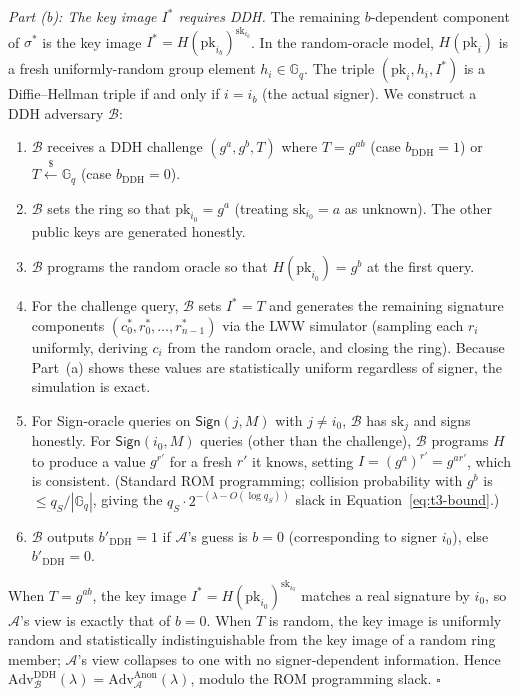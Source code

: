 \emph{Part (b): The key image $I^*$ requires DDH.} The remaining $b$-dependent component of $\sigma^*$ is the key image $I^* = H(\text{pk}_{i_b})^{\text{sk}_{i_b}}$. In the random-oracle model, $H(\text{pk}_i)$ is a fresh uniformly-random group element $h_i \in \mathbb{G}_q$. The triple $(\text{pk}_i, h_i, I^*)$ is a Diffie--Hellman triple if and only if $i = i_b$ (the actual signer). We construct a DDH adversary $\mathcal{B}$:
\begin{enumerate}
    \item $\mathcal{B}$ receives a DDH challenge $(g^a, g^b, T)$ where $T = g^{ab}$ (case $b_{\text{DDH}} = 1$) or $T \stackrel{\$}{\leftarrow} \mathbb{G}_q$ (case $b_{\text{DDH}} = 0$).
    \item $\mathcal{B}$ sets the ring so that $\text{pk}_{i_0} = g^a$ (treating $\text{sk}_{i_0} = a$ as unknown). The other public keys are generated honestly.
    \item $\mathcal{B}$ programs the random oracle so that $H(\text{pk}_{i_0}) = g^b$ at the first query.
    \item For the challenge query, $\mathcal{B}$ sets $I^* = T$ and generates the remaining signature components $(c_0^*, r_0^*, \ldots, r_{n-1}^*)$ via the LWW simulator (sampling each $r_i$ uniformly, deriving $c_i$ from the random oracle, and closing the ring). Because Part~(a) shows these values are statistically uniform regardless of signer, the simulation is exact.
    \item For Sign-oracle queries on $\mathsf{Sign}(j, M)$ with $j \neq i_0$, $\mathcal{B}$ has $\text{sk}_j$ and signs honestly. For $\mathsf{Sign}(i_0, M)$ queries (other than the challenge), $\mathcal{B}$ programs $H$ to produce a value $g^{r'}$ for a fresh $r'$ it knows, setting $I = (g^a)^{r'} = g^{a r'}$, which is consistent. (Standard ROM programming; collision probability with $g^b$ is $\leq q_S / |\mathbb{G}_q|$, giving the $q_S \cdot 2^{-(\lambda - O(\log q_S))}$ slack in Equation~\eqref{eq:t3-bound}.)
    \item $\mathcal{B}$ outputs $b'_{\text{DDH}} = 1$ if $\mathcal{A}$'s guess is $b = 0$ (corresponding to signer $i_0$), else $b'_{\text{DDH}} = 0$.
\end{enumerate}
When $T = g^{ab}$, the key image $I^* = H(\text{pk}_{i_0})^{\text{sk}_{i_0}}$ matches a real signature by $i_0$, so $\mathcal{A}$'s view is exactly that of $b = 0$. When $T$ is random, the key image is uniformly random and statistically indistinguishable from the key image of a random ring member; $\mathcal{A}$'s view collapses to one with no signer-dependent information. Hence $\mathrm{Adv}^{\mathrm{DDH}}_{\mathcal{B}}(\lambda) = \mathrm{Adv}^{\mathrm{Anon}}_{\mathcal{A}}(\lambda)$, modulo the ROM programming slack. \hfill $\square$

